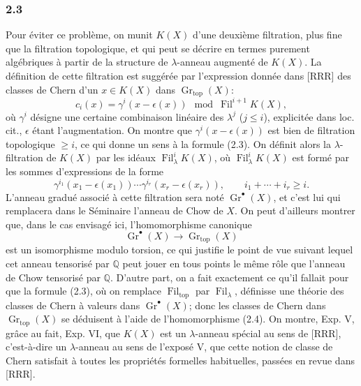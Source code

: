 \documentclass[11pt]{article}
\newcommand{\Gr}{\operatorname{Gr}}
\newcommand{\Fil}{\operatorname{Fil}}
\providecommand{\Gr}{\operatorname{Gr}}
\providecommand{\Gr}{\operatorname{G}}
\begin{document}
\subsubsection*{2.3}
Pour éviter ce problème, on munit $K(X)$ d'une deuxième filtration, plus fine que la filtration topologique, et qui peut se décrire en termes purement algébriques à partir de la structure de $\lambda$-anneau augmenté de $K(X)$. La définition de cette filtration est suggérée par l'expression donnée dans [RRR] des classes de Chern d'un $x\in K(X)$ dans $\Gr_{\mathrm{top}}(X)$:
\begin{equation}\tag{2.3}
c_i(x)=\gamma^i(x-\epsilon(x))\mod \Fil^{i+1}K(X),
\end{equation}
où $\gamma^i$ désigne une certaine combinaison linéaire des $\lambda^j$ ($j\le i$), explicitée dans loc. cit., $\epsilon$ étant l'augmentation. On montre que $\gamma^i(x-\epsilon(x))$ est bien de filtration topologique $\ge i$, ce qui donne un sens à la formule (2.3). On définit alors la $\lambda$-filtration de $K(X)$ par les idéaux $\Fil^i_\lambda K(X)$, où $\Fil^i_\lambda K(X)$ est formé par les sommes d'expressions de la forme
\[
\gamma^{i_1}(x_1-\epsilon(x_1))\cdots \gamma^{i_r}(x_r-\epsilon(x_r)),\qquad i_1+\cdots+i_r\ge i.
\]
L'anneau gradué associé à cette filtration sera noté $\Gr^\bullet(X)$, et c'est lui qui remplacera dans le Séminaire l'anneau de Chow de $X$. On peut d'ailleurs montrer que, dans le cas envisagé ici, l'homomorphisme canonique
\begin{equation}\tag{2.4}
\Gr^\bullet(X)\longrightarrow \Gr_{\mathrm{top}}(X)
\end{equation}
est un isomorphisme modulo torsion, ce qui justifie le point de vue suivant lequel cet anneau tensorisé par $\mathbb Q$ peut jouer en tous points le même rôle que l'anneau de Chow tensorisé par $\mathbb Q$. D'autre part, on a fait exactement ce qu'il fallait pour que la formule (2.3), où on remplace $\Fil_{\mathrm{top}}$ par $\Fil_\lambda$, définisse une théorie des classes de Chern à valeurs dans $\Gr^\bullet(X)$; donc les classes de Chern dans $\Gr_{\mathrm{top}}(X)$ se déduisent à l'aide de l'homomorphisme (2.4). On montre, Exp. V, grâce au fait, Exp. VI, que $K(X)$ est un $\lambda$-anneau spécial au sens de [RRR], c'est-à-dire un $\lambda$-anneau au sens de l'exposé V, que cette notion de classe de Chern satisfait à toutes les propriétés formelles habituelles, passées en revue dans [RRR].
\end{document}
